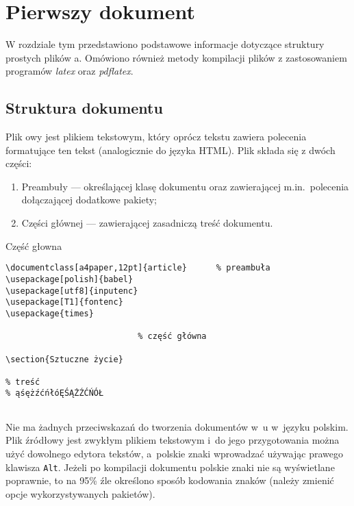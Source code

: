\chapter{Pierwszy dokument}\label{cha:pierwszyDokument}

W rozdziale tym przedstawiono podstawowe informacje dotyczące struktury prostych plików \LateX a. Omówiono również metody kompilacji plików z zastosowaniem programów \emph{latex} oraz \emph{pdflatex}. %


\section{Struktura dokumentu}\label{sec:strukturaDokumentu}

Plik \LateX owy jest plikiem tekstowym, który oprócz tekstu zawiera polecenia formatujące ten tekst (analogicznie do języka HTML). Plik składa się z dwóch części: %
\begin{enumerate}%
\item Preambuły --- określającej klasę dokumentu oraz zawierającej m.in.\ polecenia dołączającej dodatkowe pakiety;

\item Części głównej --- zawierającej zasadniczą treść dokumentu.
\end{enumerate}

\begin{program}
  \caption{Część głowna}
\begin{lstlisting}
\documentclass[a4paper,12pt]{article}      % preambuła
\usepackage[polish]{babel}
\usepackage[utf8]{inputenc}
\usepackage[T1]{fontenc}
\usepackage{times}

                           % część główna

\section{Sztuczne życie}

% treść
% ąśężźćńłóĘŚĄŻŹĆŃÓŁ


\end{lstlisting}
\end{program}

Nie ma żadnych przeciwskazań do tworzenia dokumentów w~\LateX u w~języku polskim. Plik źródłowy jest zwykłym plikiem tekstowym i~do jego przygotowania można użyć dowolnego edytora tekstów, a~polskie znaki wprowadzać używając prawego klawisza \texttt{Alt}. Jeżeli po kompilacji dokumentu polskie znaki nie są wyświetlane poprawnie, to na 95\% źle określono sposób kodowania znaków (należy zmienić opcje wykorzystywanych pakietów).  %


